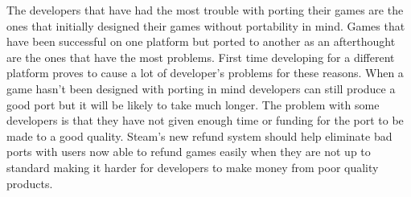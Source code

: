 \documentclass{scrartcl}
\begin{document}
The developers that have had the most trouble with porting their games are the ones that initially designed their games without portability in mind. Games that have been successful on one platform but ported to another as an afterthought are the ones that have the most problems. First time developing for a different platform proves to cause a lot of developer’s problems for these reasons. 
\newline
\newline
When a game hasn’t been designed with porting in mind developers can still produce a good port but it will be likely to take much longer. The problem with some developers is that they have not given enough time or funding for the port to be made to a good quality.
\newline
\newline
Steam’s new refund system should help eliminate bad ports with users now able to refund games easily when they are not up to standard making it harder for developers to make money from poor quality products.




\end{document}
